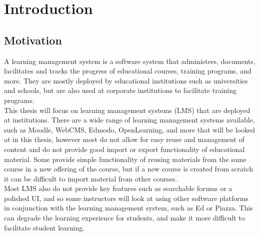 \chapter{Introduction}\label{ch:intro}

\section{Motivation}
A learning management system is a software system that administers, documents, facilitates and tracks the progress of educational courses, training programs, and more. They are mostly deployed by educational institutions such as universities and schools, but are also used at corporate institutions to facilitate training programs\cite{lmsdefinition}. \\

This thesis will focus on learning management systems (LMS) that are deployed at institutions. There are a wide range of learning management systems available, such as Moodle, WebCMS, Edmodo, OpenLearning, and more that will be looked at in this thesis, however most do not allow for easy reuse and management of content and do not provide good import or export functionality of educational material. Some provide simple functionality of reusing materials from the same course in a new offering of the course, but if a new course is created from scratch it can be difficult to import material from other courses.\\

Most LMS also do not provide key features such as searchable forums or a polished UI, and so some instructors will look at using other software platforms in conjunction with the learning management system, such as Ed or Piazza. This can degrade the learning experience for students, and make it more difficult to facilitate student learning.\\

